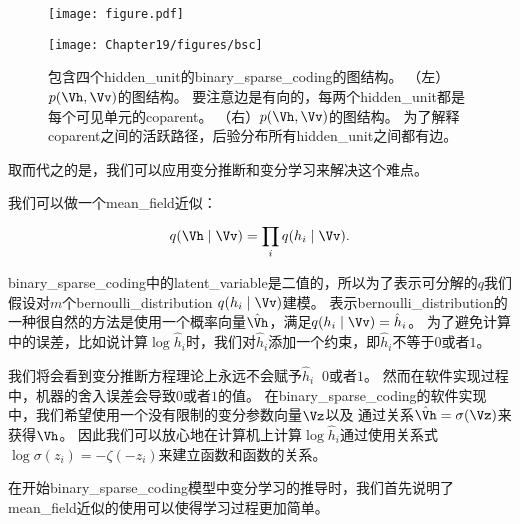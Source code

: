 \begin{figure}[!htb]
\ifOpenSource
\centerline{\texttt{[image: figure.pdf]}}
\else
	\centerline{\texttt{[image: Chapter19/figures/bsc]}}
\fi
\caption{包含四个\gls{hidden_unit}的\gls{binary_sparse_coding}的图结构。
（左）$p(\Vh,\Vv)$的图结构。
要注意边是有向的，每两个\gls{hidden_unit}都是每个可见单元的\gls{coparent}。
（右）$p(\Vh,\Vv)$的图结构。
为了解释\gls{coparent}之间的活跃路径，后验分布所有\gls{hidden_unit}之间都有边。}
	\label{fig:bsc}
\end{figure}



取而代之的是，我们可以应用变分推断和变分学习来解决这个难点。


我们可以做一个\gls{mean_field}近似：
\begin{align}
	q(\Vh\mid\Vv) = \prod_{i}^{}q(h_i\mid\Vv).
\end{align}


\gls{binary_sparse_coding}中的\gls{latent_variable}是二值的，所以为了表示可分解的$q$我们假设对$m$个\gls{bernoulli_distribution} $q(h_i\mid\Vv)$建模。
表示\gls{bernoulli_distribution}的一种很自然的方法是使用一个概率向量$\hat{\Vh}$，满足$q(h_i\mid\Vv) = \hat{h}_i$。
为了避免计算中的误差，比如说计算$\log \hat{h}_i$时，我们对$\hat{h}_i$添加一个约束，即$\hat{h}_i$不等于$0$或者$1$。


我们将会看到变分推断方程理论上永远不会赋予$\hat{h}_i\ $ $0$或者$1$。
然而在软件实现过程中，机器的舍入误差会导致$0$或者$1$的值。
在\gls{binary_sparse_coding}的软件实现中，我们希望使用一个没有限制的变分参数向量$\Vz$以及
通过关系$\hat{\Vh} = \sigma(\Vz)$来获得$\Vh$。
因此我们可以放心地在计算机上计算$\log \hat{h}_i$通过使用关系式$\log \sigma(z_i) = -\zeta(-z_i)$来建立函数和函数的关系。


在开始\gls{binary_sparse_coding}模型中变分学习的推导时，我们首先说明了\gls{mean_field}近似的使用可以使得学习过程更加简单。


